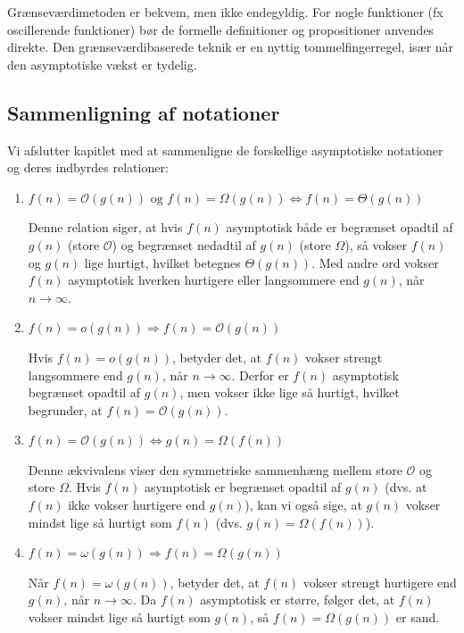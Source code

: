         Grænseværdimetoden er bekvem, men ikke endegyldig. For nogle funktioner (fx oscillerende funktioner) bør de formelle definitioner og propositioner anvendes direkte. Den grænseværdibaserede teknik er en nyttig tommelfingerregel, især når den asymptotiske vækst er tydelig.
    
\subsection*{Sammenligning af notationer}
Vi afslutter kapitlet med at sammenligne de forskellige asymptotiske notationer og deres indbyrdes relationer:

\begin{enumerate}
    \item \( f(n) = \mathcal{O}(g(n)) \text{ og } f(n) = \Omega(g(n)) \Leftrightarrow f(n) = \Theta(g(n)) \)
    
    Denne relation siger, at hvis \( f(n) \) asymptotisk både er begrænset opadtil af \( g(n) \) (store \(\mathcal{O}\)) og begrænset nedadtil af \( g(n) \) (store \(\Omega\)), så vokser \( f(n) \) og \( g(n) \) lige hurtigt, hvilket betegnes \( \Theta(g(n)) \). Med andre ord vokser \( f(n) \) asymptotisk hverken hurtigere eller langsommere end \( g(n) \), når \( n \to \infty \). \medskip

    \item \( f(n) = o(g(n)) \Rightarrow f(n) = \mathcal{O}(g(n)) \)
    
    Hvis \( f(n) = o(g(n)) \), betyder det, at \( f(n) \) vokser strengt langsommere end \( g(n) \), når \( n \to \infty \). Derfor er \( f(n) \) asymptotisk begrænset opadtil af \( g(n) \), men vokser ikke lige så hurtigt, hvilket begrunder, at \( f(n) = \mathcal{O}(g(n)) \).\medskip

    \item \( f(n) = \mathcal{O}(g(n)) \Leftrightarrow g(n) = \Omega(f(n)) \)
    
    Denne ækvivalens viser den symmetriske sammenhæng mellem store \(\mathcal{O}\) og store \(\Omega\). Hvis \( f(n) \) asymptotisk er begrænset opadtil af \( g(n) \) (dvs. at \( f(n) \) ikke vokser hurtigere end \( g(n) \)), kan vi også sige, at \( g(n) \) vokser mindst lige så hurtigt som \( f(n) \) (dvs. \( g(n) = \Omega(f(n)) \)). \medskip

    \item \( f(n) = \omega(g(n)) \Rightarrow f(n) = \Omega(g(n)) \)
    
    Når \( f(n) = \omega(g(n)) \), betyder det, at \( f(n) \) vokser strengt hurtigere end \( g(n) \), når \( n \to \infty \). Da \( f(n) \) asymptotisk er større, følger det, at \( f(n) \) vokser mindst lige så hurtigt som \( g(n) \), så \( f(n) = \Omega(g(n)) \) er sand. \medskip


\end{enumerate}
